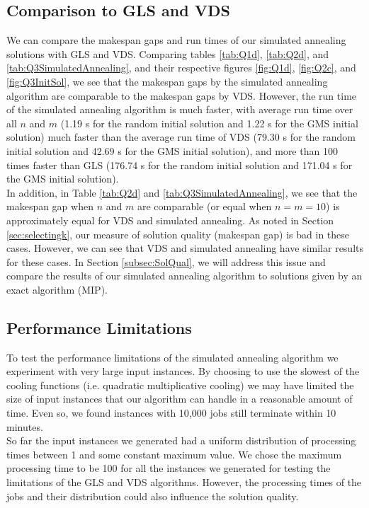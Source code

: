 \documentclass[12pt,a4paper,reqno]{article}
\begin{document}
\subsection{Comparison to GLS and VDS} \label{subsec:SimAnn_Comp}
We can compare the makespan gaps and run times of our simulated annealing solutions with GLS and VDS. 
Comparing tables \ref{tab:Q1d}, \ref{tab:Q2d}, and \ref{tab:Q3SimulatedAnnealing}, and their respective figures \ref{fig:Q1d}, \ref{fig:Q2c}, and \ref{fig:Q3InitSol}, we see that the makespan gaps by the simulated annealing algorithm are comparable to the makespan gaps by VDS. However, the run time of the simulated annealing algorithm is much faster, with average run time over all $n$ and $m$ (1.19 s for the random initial solution and 1.22 s for the GMS initial solution) much faster than the average run time of VDS (79.30 s for the random initial solution and 42.69 s for the GMS initial solution), and more than 100 times faster than GLS (176.74 s for the random initial solution and 171.04 s for the GMS initial solution). \\

In addition, in Table \ref{tab:Q2d} and \ref{tab:Q3SimulatedAnnealing}, we see that the makespan gap when $n$ and $m$ are comparable (or equal when $n=m=10$) is approximately equal for VDS and simulated annealing. As noted in Section \ref{sec:selectingk}, our measure of solution quality (makespan gap) is bad in these cases. However, we can see that VDS and simulated annealing have similar results for these cases. In Section \ref{subsec:SolQual}, we will address this issue and compare the results of our simulated annealing algorithm to solutions given by an exact algorithm (MIP). 

\subsection{Performance Limitations} \label{subsec:SimAnn_Limit}
To test the performance limitations of the simulated annealing algorithm we experiment with very large input instances. By choosing to use the slowest of the cooling functions (i.e. quadratic multiplicative cooling) we may have limited the size of input instances that our algorithm can handle in a reasonable amount of time. Even so, we found instances with 10,000 jobs still terminate within 10 minutes. \\

So far the input instances we generated had a uniform distribution of processing times between 1 and some constant maximum value. We chose the maximum processing time to be 100 for all the instances we generated for testing the limitations of the GLS and VDS algorithms. However, the processing times of the jobs and their distribution could also influence the solution quality. \\
\end{document}

